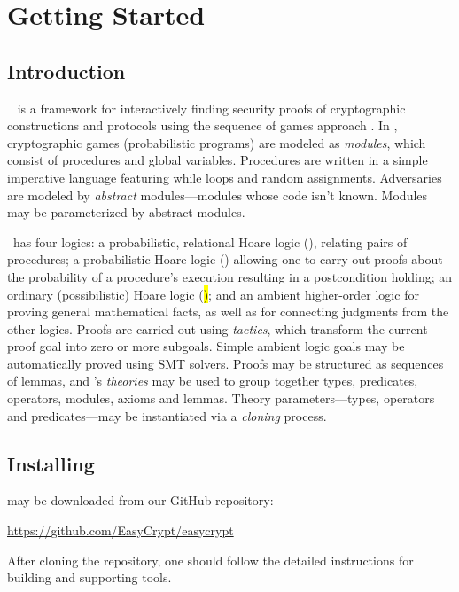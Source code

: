 \chapter{Getting Started}

\section{Introduction}

\EasyCrypt\ \cite{barthe-easycrypt-intro-2014,barthe-crypto-2011} is a
framework for interactively finding security proofs of cryptographic
constructions and protocols using the sequence of games approach
\cite{bellare-rogaway-code-based-2004,%
  bellare-rogaway-triple-enc-2006,shoup-seq-games-2004}.  In
\EasyCrypt, cryptographic games (probabilistic programs) are modeled
as \emph{modules}, which consist of procedures and global variables.
Procedures are written in a simple imperative language featuring while
loops and random assignments. Adversaries are modeled by \emph{abstract}
modules---modules whose code isn't known. Modules may be parameterized
by abstract modules.

\EasyCrypt\ has four logics: a probabilistic, relational Hoare logic
(\prhl), relating pairs of procedures; a probabilistic Hoare logic
(\phl) allowing one to carry out proofs about the probability of a
procedure's execution resulting in a postcondition holding; an
ordinary (possibilistic) Hoare logic (\hl); and an ambient
higher-order logic for proving general mathematical facts, as well as
for connecting judgments from the other logics.  Proofs are carried
out using \emph{tactics}, which transform the current proof goal into
zero or more subgoals. Simple ambient logic goals may be automatically
proved using SMT solvers. Proofs may be structured as sequences of
lemmas, and \EasyCrypt's \emph{theories} may be used to group together
types, predicates, operators, modules, axioms and lemmas. Theory
parameters---types, operators and predicates---may be instantiated via
a \emph{cloning} process.

\section{Installing \EasyCrypt}

\EasyCrypt may be downloaded from our GitHub repository:
\begin{center}
  \url{https://github.com/EasyCrypt/easycrypt}
\end{center}
After cloning the repository, one should follow the detailed
instructions for building \EasyCrypt and supporting tools.

